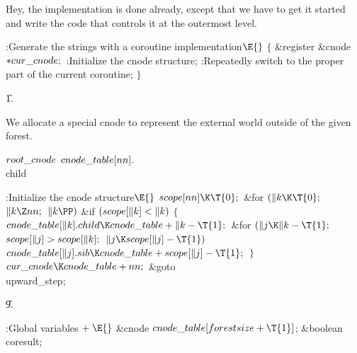 Hey, the implementation is done already, except that we
have to
get it started and write the code that controls it at the outermost level.

\Y\B\4:Generate the strings with a coroutine implementation\X${}\E{}$\6
${}\{{}$\1\6
\&{register} \&{cnode} ${}{*}\\{cur\_cnode};{}$\7
:Initialize the cnode structure\X;\6
:Repeatedly switch to the proper part of the current coroutine\X;\6
\4${}\}{}$\2\par
\U1.\fi

We allocate a special cnode to represent the external
world outside of the
given forest.

\Y\B\4\D$\\{root\_cnode}$ \5
$\\{cnode\_table}[\\{nn}].{}$\\{child}\par
\Y\B\4:Initialize the cnode structure\X${}\E{}$\6
$\\{scope}[\\{nn}]\K\T{0};{}$\6
\&{for} ${}(\|k\K\T{0};{}$ ${}\|k\Z\\{nn};{}$ ${}\|k\PP){}$\1\6
\&{if} ${}(\\{scope}[\|k]<\|k){}$\5
${}\{{}$\1\6
${}\\{cnode\_table}[\|k].\\{child}\K\\{cnode\_table}+\|k-\T{1};{}$\6
\&{for} ${}(\|j\K\|k-\T{1};{}$ ${}\\{scope}[\|j]>\\{scope}[\|k];{}$ ${}\|j\K%
\\{scope}[\|j]-\T{1}){}$\1\5
${}\\{cnode\_table}[\|j].\\{sib}\K\\{cnode\_table}+\\{scope}[\|j]-\T{1};{}$\2\6
\4${}\}{}$\2\2\6
${}\\{cur\_cnode}\K\\{cnode\_table}+\\{nn};{}$\6
\&{goto} \\{upward\_step};\par
\U9.\fi

\B{}:Global variables\X${}\mathrel+\E{}$\6
\&{cnode} ${}\\{cnode\_table}[\\{forestsize}+\T{1}]{}$;\6
\&{boolean} \\{coresult};\par
\fi

